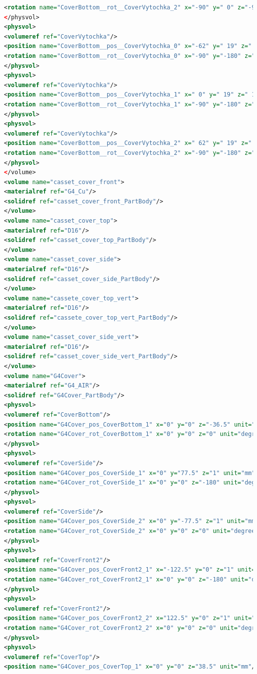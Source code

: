 \begin{lstlisting}[language=XML, firstline=1, lastline=89]
<rotation name="CoverBottom__rot__CoverVytochka_2" x="-90" y=" 0" z="-90" unit="deg"/>
</physvol>
<physvol>
<volumeref ref="CoverVytochka"/>
<position name="CoverBottom__pos__CoverVytochka_0" x="-62" y=" 19" z=" 1" unit="mm"/>
<rotation name="CoverBottom__rot__CoverVytochka_0" x="-90" y="-180" z="-90" unit="deg"/>
</physvol>
<physvol>
<volumeref ref="CoverVytochka"/>
<position name="CoverBottom__pos__CoverVytochka_1" x=" 0" y=" 19" z=" 1" unit="mm"/>
<rotation name="CoverBottom__rot__CoverVytochka_1" x="-90" y="-180" z="-90" unit="deg"/>
</physvol>
<physvol>
<volumeref ref="CoverVytochka"/>
<position name="CoverBottom__pos__CoverVytochka_2" x=" 62" y=" 19" z=" 1" unit="mm"/>
<rotation name="CoverBottom__rot__CoverVytochka_2" x="-90" y="-180" z="-90" unit="deg"/>
</physvol>
</volume>
<volume name="casset_cover_front">
<materialref ref="G4_Cu"/>
<solidref ref="casset_cover_front_PartBody"/>
</volume>
<volume name="casset_cover_top">
<materialref ref="D16"/>
<solidref ref="casset_cover_top_PartBody"/>
</volume>
<volume name="casset_cover_side">
<materialref ref="D16"/>
<solidref ref="casset_cover_side_PartBody"/>
</volume>
<volume name="cassete_cover_top_vert">
<materialref ref="D16"/>
<solidref ref="cassete_cover_top_vert_PartBody"/>
</volume>
<volume name="casset_cover_side_vert">
<materialref ref="D16"/>
<solidref ref="casset_cover_side_vert_PartBody"/>
</volume>
<volume name="G4Cover">
<materialref ref="G4_AIR"/>
<solidref ref="G4Cover_PartBody"/>
<physvol>
<volumeref ref="CoverBottom"/>
<position name="G4Cover_pos_CoverBottom_1" x="0" y="0" z="-36.5" unit="mm"/>
<rotation name="G4Cover_rot_CoverBottom_1" x="0" y="0" z="0" unit="degree"/>
</physvol>
<physvol>
<volumeref ref="CoverSide"/>
<position name="G4Cover_pos_CoverSide_1" x="0" y="77.5" z="1" unit="mm"/>
<rotation name="G4Cover_rot_CoverSide_1" x="0" y="0" z="-180" unit="degree"/>
</physvol>
<physvol>
<volumeref ref="CoverSide"/>
<position name="G4Cover_pos_CoverSide_2" x="0" y="-77.5" z="1" unit="mm"/>
<rotation name="G4Cover_rot_CoverSide_2" x="0" y="0" z="0" unit="degree"/>
</physvol>
<physvol>
<volumeref ref="CoverFront2"/>
<position name="G4Cover_pos_CoverFront2_1" x="-122.5" y="0" z="1" unit="mm"/>
<rotation name="G4Cover_rot_CoverFront2_1" x="0" y="0" z="-180" unit="degree"/>
</physvol>
<physvol>
<volumeref ref="CoverFront2"/>
<position name="G4Cover_pos_CoverFront2_2" x="122.5" y="0" z="1" unit="mm"/>
<rotation name="G4Cover_rot_CoverFront2_2" x="0" y="0" z="0" unit="degree"/>
</physvol>
<physvol>
<volumeref ref="CoverTop"/>
<position name="G4Cover_pos_CoverTop_1" x="0" y="0" z="38.5" unit="mm"/>

\end{lstlisting}
